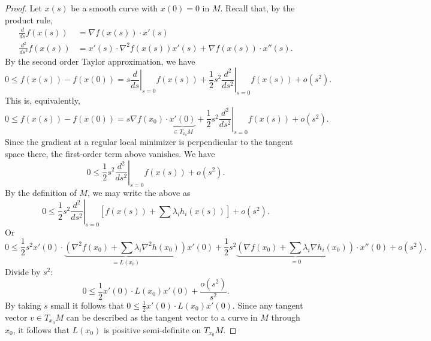 \documentclass[11pt]{article}
\begin{document}
\begin{proof}
Let $x(s)$ be a smooth curve with $x(0) = 0$ in $M$. Recall that, by the product rule,
\begin{align*}
\frac{d}{ds} f(x(s)) &= \nabla f(x(s)) \cdot x'(s) \\
\frac{d^2}{ds^2} f(x(s)) &= x'(s) \cdot \nabla^2 f(x(s)) x'(s) + \nabla f(x(s)) \cdot x''(s).
\end{align*}
By the second order Taylor approximation, we have
\[
0 \leq f(x(s)) - f(x(0)) = s \left. \frac{d}{ds} \right|_{s=0} f(x(s)) + \frac{1}{2}s^2 \left. \frac{d^2}{ds^2} \right|_{s=0} f(x(s)) + o(s^2).
\]
This is, equivalently, 
\[
0 \leq f(x(s)) - f(x(0)) = s \nabla f(x_0) \cdot \underbrace{x'(0)}_{\in T_{x_0}M} + \frac{1}{2}s^2 \left. \frac{d^2}{ds^2} \right|_{s=0} f(x(s)) + o(s^2).
\]
Since the gradient at a regular local minimizer is perpendicular to the tangent space there, the first-order term above vanishes. We have
\[
0 \leq \frac{1}{2}s^2 \left. \frac{d^2}{ds^2} \right|_{s=0} f(x(s)) + o(s^2).
\]
By the definition of $M$, we may write the above as
\[
0 \leq \frac{1}{2}s^2 \left. \frac{d^2}{ds^2} \right|_{s=0} \left[ f(x(s)) + \sum \lambda_i h_i(x(s)) \right] + o(s^2).
\]
Or
\[
0 \leq \frac{1}{2} s^2 x'(0) \cdot \underbrace{\left(\nabla^2 f(x_0) + \sum \lambda_i \nabla^2 h(x_0)\right)}_{=L(x_0)}x'(0) + \frac{1}{2} s^2 \underbrace{\left(\nabla f(x_0) + \sum \lambda_i \nabla h_i(x_0)\right)}_{=0} \cdot x''(0) + o(s^2).
\]
Divide by $s^2$:
\[
0 \leq \frac{1}{2} x'(0) \cdot L(x_0) x'(0) + \frac{o(s^2)}{s^2}.
\]
By taking $s$ small it follows that $0 \leq \frac{1}{2} x'(0) \cdot L(x_0) x'(0)$. Since any tangent vector $v \in T_{x_0}M$ can be described as the tangent vector to a curve in $M$ through $x_0$, it follows that $L(x_0)$ is positive semi-definite on $T_{x_0}M$.
\end{proof}
\end{document}
